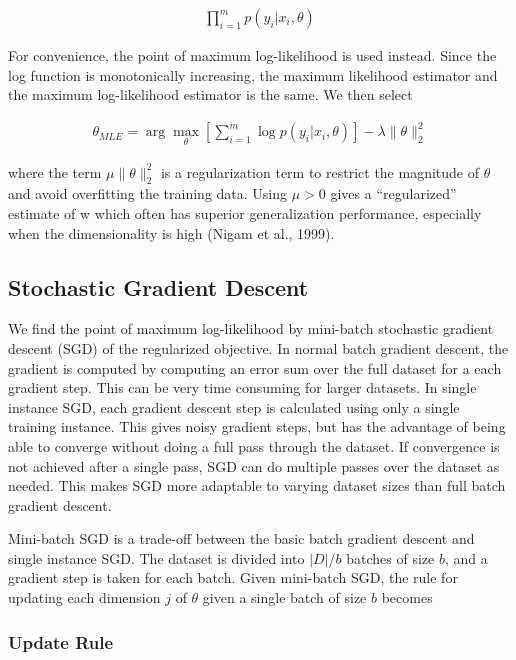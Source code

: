   \begin{eqnarray}
   \prod_{i=1}^{m} p(y_i | x_i,\theta)
   \end{eqnarray}
   
For convenience, the point of maximum log-likelihood is used instead. Since the log function is monotonically increasing, the maximum likelihood estimator and the maximum log-likelihood estimator is the same. We then select
 
  \begin{eqnarray}
  \theta_{MLE} = \arg\max_\theta [\sum_{i=1}^{m} \log p(y_i | x_i,\theta)] - \lambda \|\theta\|^{2}_{2}
  \end{eqnarray}
  
where the term $\mu\|\theta\|^{2}_{2}$  is a regularization term to restrict the magnitude of $\theta$ and avoid overfitting the training data. Using $\mu > 0$ gives a “regularized” estimate of w which often has superior generalization performance, especially when the dimensionality is high (Nigam et al., 1999). 

\subsection{Stochastic Gradient Descent}
\label{sec:gradient_descent}
We find the point of maximum log-likelihood by mini-batch stochastic gradient descent (SGD) of the regularized objective. In normal batch gradient descent, the gradient is computed by computing an error sum over the full dataset for a each gradient step. This can be very time consuming for larger datasets. In single instance SGD, each gradient descent step is calculated using only a single training instance. This gives noisy gradient steps, but has the advantage of being able to converge without doing a full pass through the dataset. If convergence is not achieved after a single pass, SGD can do multiple passes over the dataset as needed. This makes SGD more adaptable to varying dataset sizes than full batch gradient descent. 

Mini-batch SGD is a trade-off between the basic batch gradient descent and single instance SGD\citep{cotter2011batchsgd}. The dataset is divided into $|D|$/$b$ batches of size $b$, and a gradient step is taken for each batch. Given mini-batch SGD, the rule for updating each dimension $j$ of $\theta$ given a single batch of size $b$ becomes

\subsubsection{Update Rule}

